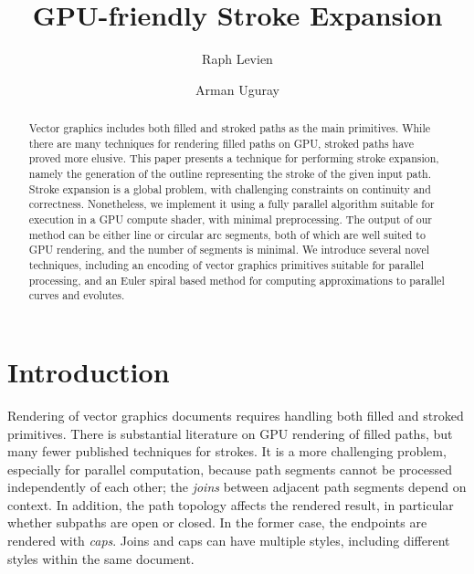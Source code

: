 \documentclass[sigconf, authordraft]{acmart}
\begin{document}
\title{GPU-friendly Stroke Expansion}
\author{Raph Levien}
\author{Arman Uguray}

\begin{abstract}
    Vector graphics includes both filled and stroked paths as the main primitives. While there are many techniques for rendering filled paths on GPU, stroked paths have proved more elusive. This paper presents a technique for performing stroke expansion, namely the generation of the outline representing the stroke of the given input path. Stroke expansion is a global problem, with challenging constraints on continuity and correctness. Nonetheless, we implement it using a fully parallel algorithm suitable for execution in a GPU compute shader, with minimal preprocessing. The output of our method can be either line or circular arc segments, both of which are well suited to GPU rendering, and the number of segments is minimal. We introduce several novel techniques, including an encoding of vector graphics primitives suitable for parallel processing, and an Euler spiral based method for computing approximations to parallel curves and evolutes.
\end{abstract}


\maketitle
\thispagestyle{empty}
\pagestyle{plain}

\section{Introduction}

Rendering of vector graphics documents requires handling both filled and stroked primitives. There is substantial literature on GPU rendering of filled paths, but many fewer published techniques for strokes. It is a more challenging problem, especially for parallel computation, because path segments cannot be processed independently of each other; the \emph{joins} between adjacent path segments depend on context. In addition, the path topology affects the rendered result, in particular whether subpaths are open or closed. In the former case, the endpoints are rendered with \emph{caps}. Joins and caps can have multiple styles, including different styles within the same document.
\end{document}

